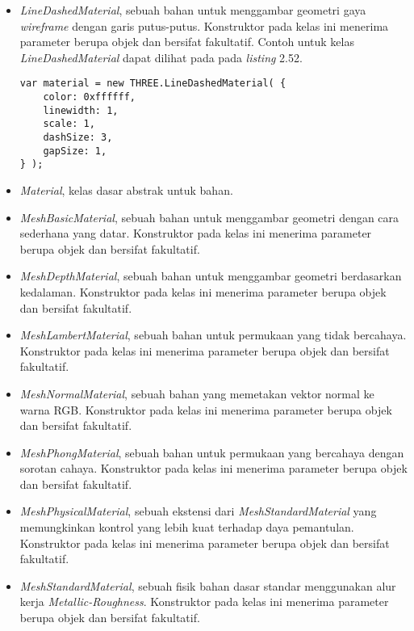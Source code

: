 \begin{itemize}
\begin{itemize}
	\item {\it LineDashedMaterial}, sebuah bahan untuk menggambar geometri gaya {\it wireframe} dengan garis putus-putus. Konstruktor pada kelas ini menerima parameter berupa objek dan bersifat fakultatif. Contoh untuk kelas {\it LineDashedMaterial} dapat dilihat pada pada {\it listing} 2.52.
	
\begin{lstlisting}[caption={Contoh penggunaan kelas {\it LineDashMaterial}.},captionpos=b]
var material = new THREE.LineDashedMaterial( {
	color: 0xffffff,
	linewidth: 1,
	scale: 1,
	dashSize: 3,
	gapSize: 1,
} );
\end{lstlisting}

	\item {\it Material}, kelas dasar abstrak untuk bahan.
	
	\item {\it MeshBasicMaterial}, sebuah bahan untuk menggambar geometri dengan cara sederhana yang datar. Konstruktor pada kelas ini menerima parameter berupa objek dan bersifat fakultatif.
	
	\item {\it MeshDepthMaterial}, sebuah bahan untuk menggambar geometri berdasarkan kedalaman. Konstruktor pada kelas ini menerima parameter berupa objek dan bersifat fakultatif.
	
	\item {\it MeshLambertMaterial}, sebuah bahan untuk permukaan yang tidak bercahaya. Konstruktor pada kelas ini menerima parameter berupa objek dan bersifat fakultatif.
	
	\item {\it MeshNormalMaterial}, sebuah bahan yang memetakan vektor normal ke warna RGB. Konstruktor pada kelas ini menerima parameter berupa objek dan bersifat fakultatif.
	
	\item {\it MeshPhongMaterial}, sebuah bahan untuk permukaan yang bercahaya dengan sorotan cahaya. Konstruktor pada kelas ini menerima parameter berupa objek dan bersifat fakultatif.
	
	\item {\it MeshPhysicalMaterial}, sebuah ekstensi dari {\it MeshStandardMaterial} yang memungkinkan kontrol yang lebih kuat terhadap daya pemantulan. Konstruktor pada kelas ini menerima parameter berupa objek dan bersifat fakultatif.
	
	\item {\it MeshStandardMaterial}, sebuah fisik bahan dasar standar menggunakan alur kerja {\it Metallic-Roughness}. Konstruktor pada kelas ini menerima parameter berupa objek dan bersifat fakultatif.
	

\end{itemize}
\end{itemize}
